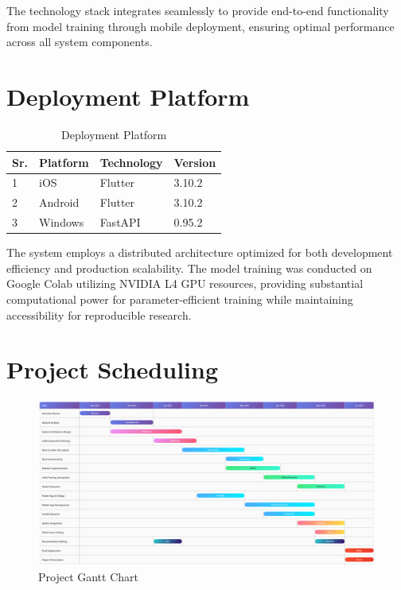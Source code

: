 \documentclass[12pt,a4paper]{report}
\begin{document}
The technology stack integrates seamlessly to provide end-to-end functionality from model training through mobile deployment, ensuring optimal performance across all system components.

\section{Deployment Platform}

\begin{table}[H]
\centering
\caption{Deployment Platform}
\label{tab:deployment_platform}
\begin{tabular}{|l|l|l|l|}
\hline
\textbf{Sr.} & \textbf{Platform} & \textbf{Technology} & \textbf{Version} \\
\hline
1 & iOS & Flutter & 3.10.2 \\
\hline
2 & Android & Flutter & 3.10.2 \\
\hline
3 & Windows & FastAPI & 0.95.2 \\
\hline
\end{tabular}
\end{table}

The system employs a distributed architecture optimized for both development efficiency and production scalability. The model training was conducted on Google Colab utilizing NVIDIA L4 GPU resources, providing substantial computational power for parameter-efficient training while maintaining accessibility for reproducible research.

\section{Project Scheduling}

\begin{figure}[H]
\centering
\includegraphics[width=\textwidth]{figures/project_schedule_gantt.png}
\caption{Project Gantt Chart}
\label{fig:project_gantt}
\end{figure}
\end{document}

